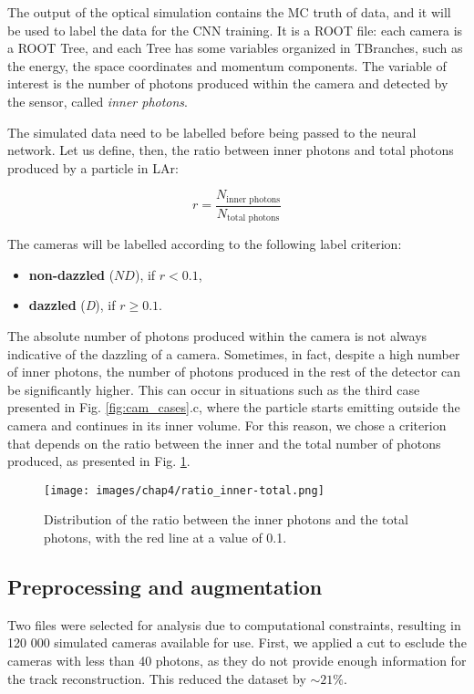 The output of the optical simulation contains the MC truth of data, and it will be used to label the data for the CNN training. It is a ROOT file: each camera is a ROOT Tree, and each Tree has some variables organized in TBranches, such as the energy, the space coordinates and momentum components. The variable of interest is the number of photons produced within the camera and detected by the sensor, called \textit{inner photons}.

The simulated data need to be labelled before being passed to the neural network.  Let us define, then, the ratio between inner photons and total photons produced by a particle in LAr:

\begin{equation}
    r = \frac{N_{\text{inner photons}}}{N_{\text{total photons}}}   
\end{equation}

The cameras will be labelled according to the following label criterion:
\begin{itemize}
    \item \textbf{non-dazzled} ($ND$), if $r < 0.1$,
    \item \textbf{dazzled} (\textit{D}), if $r \geq 0.1$.
\end{itemize}

The absolute number of photons produced within the camera is not always indicative of the dazzling of a camera. Sometimes, in fact, despite a high number of inner photons, the number of photons produced in the rest of the detector can be significantly higher. This can occur in situations such as the third case presented in Fig. \ref{fig:cam_cases}.c, where the particle starts emitting outside the camera and continues in its inner volume. For this reason, we chose a criterion that depends on the ratio between the inner and the total number of photons produced, as presented in Fig. \ref{fig:ratio-inner-total}.

\begin{figure}
    \centering
    \texttt{[image: images/chap4/ratio\_inner-total.png]}
    \caption{Distribution of the ratio between the inner photons and the total photons, with the red line at a value of 0.1.}
    \label{fig:ratio-inner-total}
\end{figure}

\subsection{Preprocessing and augmentation}
Two files were selected for analysis due to computational constraints, resulting in 120 000 simulated cameras available for use. First, we applied a cut to esclude the cameras with less than 40 photons, as they do not provide enough information for the track reconstruction. This reduced the dataset by $\sim 21\%$.

